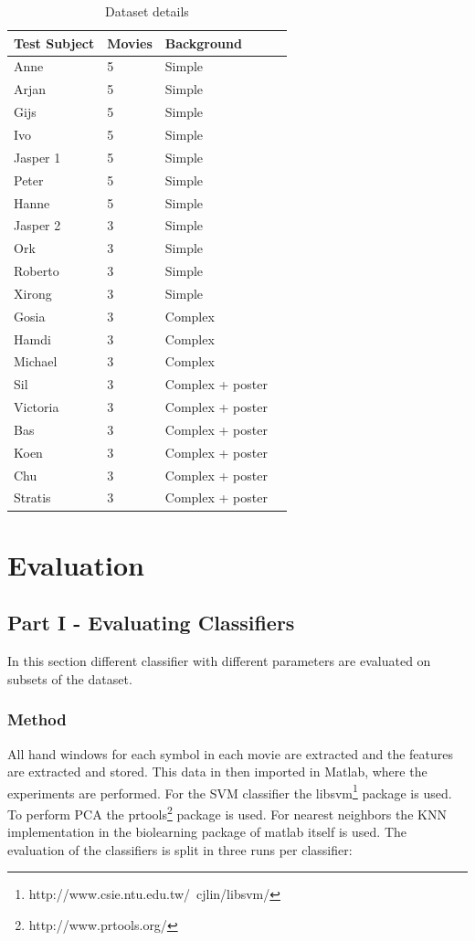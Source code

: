 \begin{table}
\centering
\begin{tabular}{llll}
\hline\hline
	Test Subject & Movies & Background &\\
\hline
	Anne     & 5 & Simple & \\
	Arjan    & 5 & Simple & \\
	Gijs     & 5 & Simple & \\
	Ivo      & 5 & Simple & \\
	Jasper 1 & 5 & Simple & \\
	Peter    & 5 & Simple & \\
	Hanne    & 5 & Simple & \\
	Jasper 2 & 3 & Simple & \\
	Ork      & 3 & Simple & \\
	Roberto  & 3 & Simple & \\
	Xirong   & 3 & Simple & \\
	Gosia    & 3 & Complex & \\
	Hamdi    & 3 & Complex & \\
	Michael  & 3 & Complex & \\
	Sil      & 3 & Complex + poster & \\
	Victoria & 3 & Complex + poster & \\
	Bas      & 3 & Complex + poster & \\
	Koen     & 3 & Complex + poster & \\
	Chu      & 3 & Complex + poster & \\
	Stratis  & 3 & Complex + poster & \\
\hline
\end{tabular}
\caption{Dataset details}
\end{table}

\section{Evaluation}

\subsection{Part I - Evaluating Classifiers}
In this section different classifier with different parameters are evaluated on subsets of the dataset.

\subsubsection{Method}
All hand windows for each symbol in each movie are extracted and the features are extracted and stored. This data in then imported in Matlab, where the experiments are performed. For the SVM classifier the libsvm\footnote{http://www.csie.ntu.edu.tw/~cjlin/libsvm/} package is used. To perform PCA the prtools\footnote{http://www.prtools.org/} package is used. For nearest neighbors the KNN implementation in the biolearning package of matlab itself is used. The evaluation of the classifiers is split in three runs per classifier:

